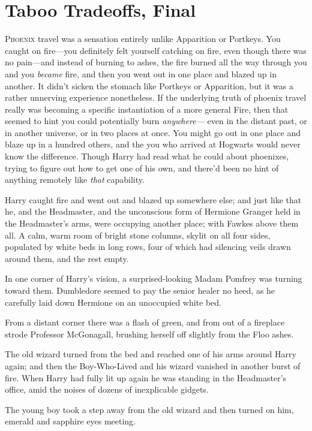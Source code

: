 \chapter{Taboo Tradeoffs, Final}

\lettrine{P}{hoenix} travel
was a sensation entirely unlike Apparition or Portkeys. You caught on
fire—you definitely felt yourself catching on fire, even though there was no
pain—and instead of burning to ashes, the fire burned all the way through you
and you \emph{became} fire, and then you went out in one place and blazed up in
another. It didn't sicken the stomach like Portkeys or Apparition, but it was a
rather unnerving experience nonetheless. If the underlying truth of phoenix
travel really was becoming a specific instantiation of a more general Fire,
then that seemed to hint you could potentially burn \emph{anywhere—} even in
the distant past, or in another universe, or in two places at once. You might
go out in one place and blaze up in a hundred others, and the you who arrived
at Hogwarts would never know the difference. Though Harry had read what he
could about phoenixes, trying to figure out how to get one of his own, and
there'd been no hint of anything remotely like \emph{that} capability.

Harry caught fire and went out and blazed up somewhere else; and just like that
he, and the Headmaster, and the unconscious form of Hermione Granger held in
the Headmaster's arms, were occupying another place; with Fawkes above them
all. A calm, warm room of bright stone columns, skylit on all four sides,
populated by white beds in long rows, four of which had silencing veils drawn
around them, and the rest empty.

In one corner of Harry's vision, a surprised-looking Madam Pomfrey was turning
toward them. Dumbledore seemed to pay the senior healer no heed, as he
carefully laid down Hermione on an unoccupied white bed.

From a distant corner there was a flash of green, and from out of a fireplace
strode Professor McGonagall, brushing herself off slightly from the Floo ashes.

The old wizard turned from the bed and reached one of his arms around Harry
again; and then the Boy-Who-Lived and his wizard vanished in another burst of
fire.
\sbreak
When Harry had fully lit up again he was standing in the Headmaster's office,
amid the noises of dozens of inexplicable gidgets.

The young boy took a step away from the old wizard and then turned on him,
emerald and sapphire eyes meeting.

